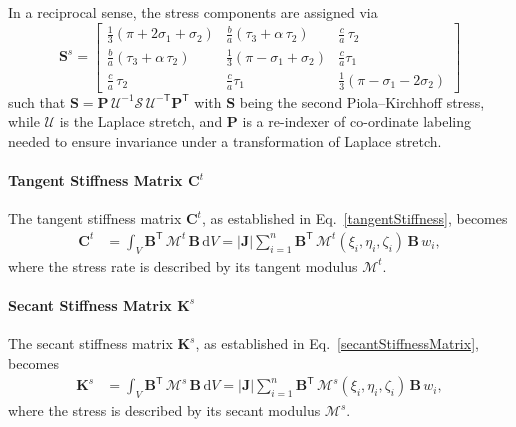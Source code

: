 In a reciprocal sense, the stress components are assigned via
\begin{equation} 
    \mathbf{S}^s = \begin{bmatrix}
    \frac{1}{3} ( \pi + 2 \sigma_1 + \sigma_2 ) &
    \frac{b}{a} (\tau_3 + \alpha \, \tau_2) &
    \frac{c}{a} \, \tau_2 \\
    \frac{b}{a} (\tau_3 + \alpha \, \tau_2) &
    \frac{1}{3} ( \pi - \sigma_1 + \sigma_2 ) &
    \frac{c}{a} \tau_1 \\
    \frac{c}{a} \, \tau_2 &
    \frac{c}{a} \tau_1 &
    \frac{1}{3} ( \pi - \sigma_1 - 2 \sigma_2 )
    \end{bmatrix}
\end{equation}    
such that $\mathbf{S} = \mathbf{P} \, \boldsymbol{\mathcal{U}}^{-1} \boldsymbol{\mathcal{S}} \, \boldsymbol{\mathcal{U}}^{-\mathsf{T}} \mathbf{P}^{\mathsf{T}}$ with $\mathbf{S}$ being the second Piola--Kirchhoff stress, while $\boldsymbol{\mathcal{U}}$ is the Laplace stretch, and $\mathbf{P}$ is a re-indexer of co-ordinate labeling needed to ensure invariance under a transformation of Laplace stretch.

\paragraph{Tangent Stiffness Matrix $\mathbf{C}^t$}

The tangent stiffness matrix $\mathbf{C}^t$, as established in Eq.~\ref{tangentStiffness}, becomes
\begin{equation}
	\begin{aligned}
		\mathbf{C}^t & =\int_{V} \mathbf{B}^{\mathsf{T}} \,  \boldsymbol{\mathcal{M}}^t \, \mathbf{B}  \,  \mathrm{d} V
		= |\mathbf{J}| \sum_{i=1}^{n} \mathbf{B}^{\mathsf{T}} \, \boldsymbol{\mathcal{M}}^t (\xi_i, \eta_i, \zeta_i) \, \mathbf{B} \, w_i ,
	\end{aligned}
\end{equation} 
where the stress rate is described by its tangent modulus $\boldsymbol{\mathcal{M}}^{t}$.

\paragraph{Secant Stiffness Matrix $\mathbf{K}^s$}

The secant stiffness matrix $\mathbf{K}^s$, as established in Eq.~\ref{secantStiffnessMatrix}, becomes
\begin{equation}
	\begin{aligned}
		\mathbf{K}^s & =\int_{V} \mathbf{B}^{\mathsf{T}} \,  \boldsymbol{\mathcal{M}}^s \, \mathbf{B}  \, \mathrm{d} V
		= |\mathbf{J}| \sum_{i=1}^{n}  \mathbf{B}^{\mathsf{T}} \, \boldsymbol{\mathcal{M}}^s (\xi_i, \eta_i, \zeta_i) \, \mathbf{B} \, w_i  ,
	\end{aligned}
\end{equation} 
where the stress is described by its secant modulus $\boldsymbol{\mathcal{M}}^{s}$.


